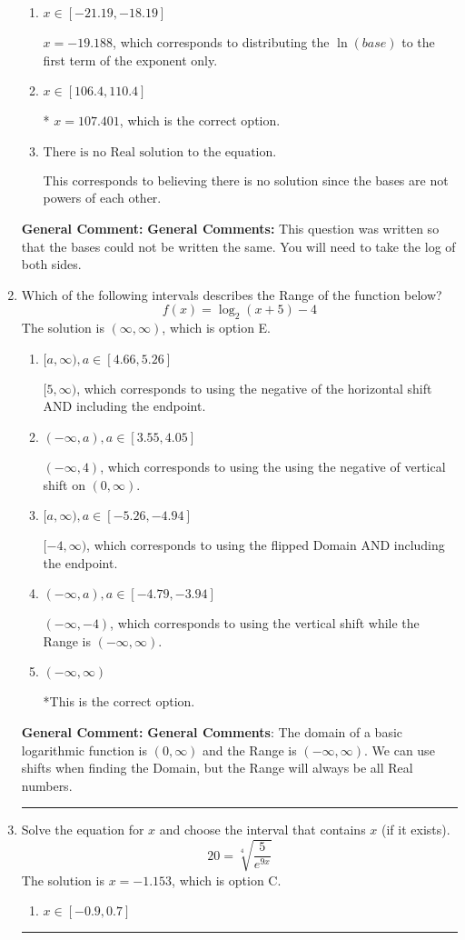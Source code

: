 \documentclass{extbook}[14pt]
\newcommand{\litem}[1]{\item #1

\rule{\textwidth}{0.4pt}}
\begin{document}
\begin{enumerate}
{\begin{enumerate}[label=\Alph*.]
$x = 0.333$, which corresponds to solving the numerators as equal while ignoring the bases are different.
\item \( x \in [-21.19, -18.19] \)

$x = -19.188$, which corresponds to distributing the $\ln(base)$ to the first term of the exponent only.
\item \( x \in [106.4, 110.4] \)

* $x = 107.401$, which is the correct option.
\item \( \text{There is no Real solution to the equation.} \)

This corresponds to believing there is no solution since the bases are not powers of each other.
\end{enumerate}

\textbf{General Comment:} \textbf{General Comments:} This question was written so that the bases could not be written the same. You will need to take the log of both sides.
}
\litem{
Which of the following intervals describes the Range of the function below?
\[ f(x) = \log_2{(x+5)}-4 \]The solution is \( (\infty, \infty) \), which is option E.\begin{enumerate}[label=\Alph*.]
\item \( [a, \infty), a \in [4.66, 5.26] \)

$[5, \infty)$, which corresponds to using the negative of the horizontal shift AND including the endpoint.
\item \( (-\infty, a), a \in [3.55, 4.05] \)

$(-\infty, 4)$, which corresponds to using the using the negative of vertical shift on $(0, \infty)$.
\item \( [a, \infty), a \in [-5.26, -4.94] \)

$[-4, \infty)$, which corresponds to using the flipped Domain AND including the endpoint.
\item \( (-\infty, a), a \in [-4.79, -3.94] \)

$(-\infty, -4)$, which corresponds to using the vertical shift while the Range is $(-\infty, \infty)$.
\item \( (-\infty, \infty) \)

*This is the correct option.
\end{enumerate}

\textbf{General Comment:} \textbf{General Comments}: The domain of a basic logarithmic function is $(0, \infty)$ and the Range is $(-\infty, \infty)$. We can use shifts when finding the Domain, but the Range will always be all Real numbers.
}
\litem{
 Solve the equation for $x$ and choose the interval that contains $x$ (if it exists).
\[  20 = \sqrt[4]{\frac{5}{e^{9x}}} \]The solution is \( x = -1.153 \), which is option C.\begin{enumerate}[label=\Alph*.]
\item \( x \in [-0.9, 0.7] \)


\end{enumerate}}
\end{enumerate}
\end{document}
